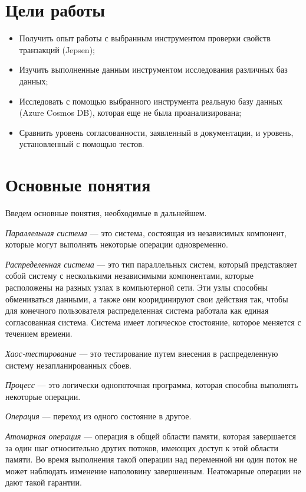 \documentclass[12pt,  openany]{book}
\begin{document}
\section{Цели работы}
\begin{itemize}
  \item Получить опыт работы с выбранным инструментом проверки свойств транзакций (Jepsen);
  \item Изучить выполненные данным инструментом исследования различных баз данных;
  \item Исследовать с помощью выбранного инструмента реальную базу данных (Azure Cosmos DB), которая еще не была проанализирована;
  \item Сравнить уровень согласованности, заявленный в документации, и уровень, установленный с помощью тестов.
\end{itemize}

\section{Основные понятия}
Введем основные понятия,  необходимые в дальнейшем.

\emph{Параллельная система} ---  это система, состоящая из независимых компонент, которые могут выполнять некоторые операции одновременно.

\emph{Распределенная система} ---  это тип параллельных систем, который представляет собой систему с несколькими независимыми компонентами, которые расположены на разных узлах в компьютерной сети.  Эти узлы способны обмениваться данными, а также они кооридинируют свои действия так, чтобы для конечного пользователя распределенная система работала как единая согласованная система.  Система имеет логическое стостояние, которое меняется с течением времени. 

\emph{Хаос-тестирование \cite{chaosTesting}} ---  это тестирование путем внесения в распределенную систему незапланированных сбоев.

\emph{Процесс} ---  это логически однопоточная программа, которая способна выполнять некоторые операции. 

\emph{Операция} --- переход из одного состояние в другое. 

\emph{Атомарная операция \cite{habrAtomicOperation}} --- операция в общей области памяти, которая завершается за один шаг относительно других потоков, имеющих доступ к этой области памяти.  Во время выполнения такой операции над переменной ни один поток не может наблюдать изменение наполовину завершенным. Неатомарные операции не дают такой гарантии.
\end{document}
